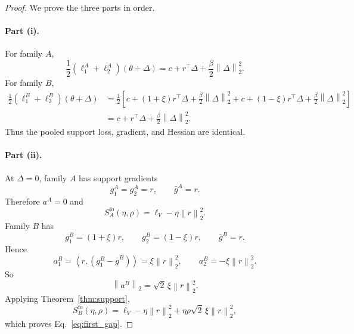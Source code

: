 \documentclass{article}
\newcommand{\norm}[1]{\left\lVert #1 \right\rVert}
\newcommand{\inner}[2]{\left\langle #1, #2 \right\rangle}
\begin{document}
\begin{proof}
We prove the three parts in order.

\paragraph{Part (i).}
For family $A$,
\begin{equation}
    \frac{1}{2}\left(\ell_1^A + \ell_2^A\right)(\theta+\Delta)
    =
    c + r^\top \Delta + \frac{\beta}{2}\norm{\Delta}_2^2.
\end{equation}
For family $B$,
\begin{align}
    \frac{1}{2}\left(\ell_1^B + \ell_2^B\right)(\theta+\Delta)
    &=
    \frac{1}{2}
    \left[
        c + (1+\xi)r^\top \Delta + \frac{\beta}{2}\norm{\Delta}_2^2
        +
        c + (1-\xi)r^\top \Delta + \frac{\beta}{2}\norm{\Delta}_2^2
    \right] \\
    &=
    c + r^\top \Delta + \frac{\beta}{2}\norm{\Delta}_2^2.
\end{align}
Thus the pooled support loss, gradient, and Hessian are identical.

\paragraph{Part (ii).}
At $\Delta = 0$, family $A$ has support gradients
\begin{equation}
    g_1^A = g_2^A = r,
    \qquad
    \bar g^A = r.
\end{equation}
Therefore $a^A = 0$ and
\begin{equation}
    S_A^{\mathrm{fo}}(\eta,\rho)
    =
    \ell_V - \eta \norm{r}_2^2.
\end{equation}
Family $B$ has
\begin{equation}
    g_1^B = (1+\xi)r,
    \qquad
    g_2^B = (1-\xi)r,
    \qquad
    \bar g^B = r.
\end{equation}
Hence
\begin{equation}
    a_1^B = \inner{r}{(g_1^B-\bar g^B)} = \xi \norm{r}_2^2,
    \qquad
    a_2^B = -\xi \norm{r}_2^2.
\end{equation}
So
\begin{equation}
    \norm{a^B}_2 = \sqrt{2}\,\xi \norm{r}_2^2.
\end{equation}
Applying Theorem~\ref{thm:support},
\begin{equation}
    S_B^{\mathrm{fo}}(\eta,\rho)
    =
    \ell_V - \eta \norm{r}_2^2 + \eta \rho \sqrt{2}\,\xi \norm{r}_2^2,
\end{equation}
which proves Eq.~\eqref{eq:first_gap}.


\end{proof}
\end{document}
